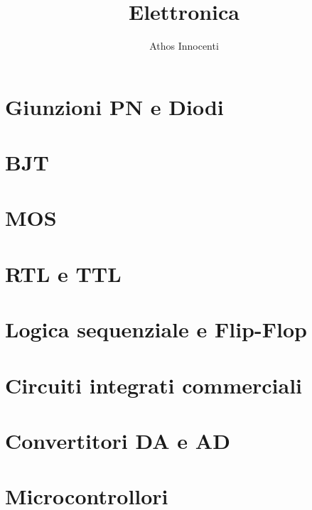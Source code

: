 \documentclass[10pt, a4paper]{report}
\author{Athos Innocenti}
\title{\Huge Elettronica}\date{}\author{}
\begin{document}
\maketitle
\tableofcontents
\chapter{Giunzioni PN e Diodi}
\chapter{BJT}
\chapter{MOS}
\chapter{RTL e TTL}
\chapter{Logica sequenziale e Flip-Flop}
\chapter{Circuiti integrati commerciali}
\chapter{Convertitori DA e AD}
\chapter{Microcontrollori}
\end{document}
